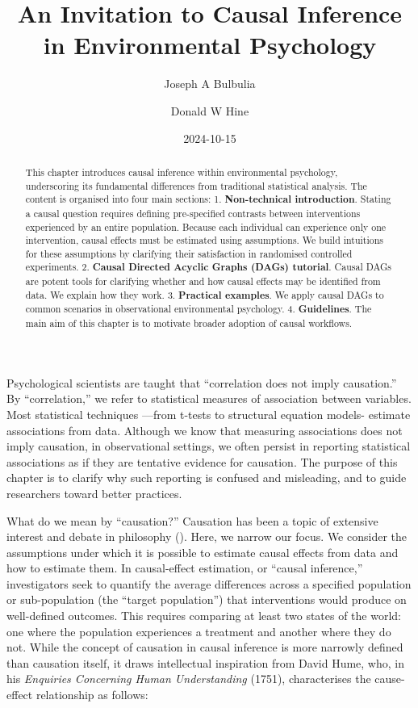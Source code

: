 \documentclass[
  singlecolumn]{article}
\title{An Invitation to Causal Inference in Environmental Psychology}
\author{Joseph A Bulbulia}
\affil{%
             \small{     Victoria University of Wellington, New Zealand,
School of Psychology, Centre for Applied Cross-Cultural Research
          ORCID \textcolor[HTML]{A6CE39}{\aiOrcid} ~0000-0002-5861-2056 }
              }
\author{Donald W Hine}
\affil{%
             \small{     University of Canterbury, School of Psychology,
Speech and Hearing
          ORCID \textcolor[HTML]{A6CE39}{\aiOrcid} ~0000-0002-3905-7026 }
              }
\date{2024-10-15}
\begin{document}
\maketitle
\begin{abstract}
This chapter introduces causal inference within environmental
psychology, underscoring its fundamental differences from traditional
statistical analysis. The content is organised into four main sections:
1. \textbf{Non-technical introduction}. Stating a causal question
requires defining pre-specified contrasts between interventions
experienced by an entire population. Because each individual can
experience only one intervention, causal effects must be estimated using
assumptions. We build intuitions for these assumptions by clarifying
their satisfaction in randomised controlled experiments. 2.
\textbf{Causal Directed Acyclic Graphs (DAGs) tutorial}. Causal DAGs are
potent tools for clarifying whether and how causal effects may be
identified from data. We explain how they work. 3. \textbf{Practical
examples}. We apply causal DAGs to common scenarios in observational
environmental psychology. 4. \textbf{Guidelines}. The main aim of this
chapter is to motivate broader adoption of causal workflows.
\end{abstract}


Psychological scientists are taught that ``correlation does not imply
causation.'' By ``correlation,'' we refer to statistical measures of
association between variables. Most statistical techniques ---from
t-tests to structural equation models- estimate associations from data.
Although we know that measuring associations does not imply causation,
in observational settings, we often persist in reporting statistical
associations as if they are tentative evidence for causation. The
purpose of this chapter is to clarify why such reporting is confused and
misleading, and to guide researchers toward better practices.

What do we mean by ``causation?'' Causation has been a topic of
extensive interest and debate in philosophy
(). Here, we narrow our focus. We
consider the assumptions under which it is possible to estimate causal
effects from data and how to estimate them. In causal-effect estimation,
or ``causal inference,'' investigators seek to quantify the average
differences across a specified population or sub-population (the
``target population'') that interventions would produce on well-defined
outcomes. This requires comparing at least two states of the world: one
where the population experiences a treatment and another where they do
not. While the concept of causation in causal inference is more narrowly
defined than causation itself, it draws intellectual inspiration from
David Hume, who, in his \emph{Enquiries Concerning Human Understanding}
(1751), characterises the cause-effect relationship as follows:
\end{document}
